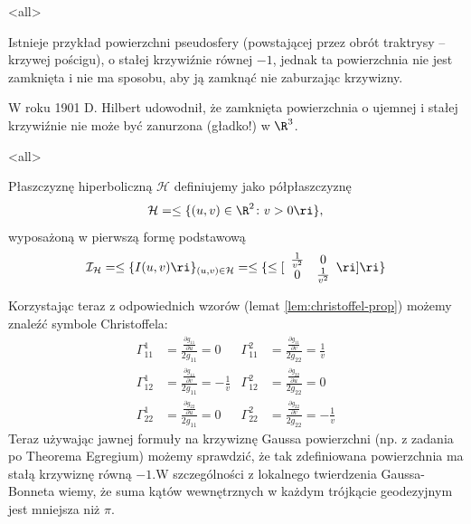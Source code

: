 \mode*
\mode<all>{}

\begin{frame}
Istnieje przykład powierzchni pseudosfery (powstającej przez obrót traktrysy -- krzywej pościgu), o stałej krzywiźnie równej $-1$, jednak ta powierzchnia nie jest zamknięta i nie ma sposobu, aby ją zamknąć nie zaburzając krzywizny.
\pause\begin{center}

\end{center}

\pause W roku 1901 D. Hilbert udowodnił, że zamknięta powierzchnia o ujemnej i stałej krzywiźnie nie może być zanurzona (gładko!) w $\R^3$. 

\end{frame}
\mode<all>{}

\begin{frame}

\begin{definicja}
Płaszczyznę hiperboliczną $\mathcal{H}$ definiujemy jako półpłaszczyznę 
\[\mathcal{H}=\le\{(u,v)\in \R^2\colon v>0 \ri\},\] wyposażoną w pierwszą formę podstawową
\[\mathcal{I}_{\mathcal{H}}=\le\{I(u,v)\ri\}_{(u,v)\in \mathcal{H}}=\le\{\le[
\begin{array}{cc}
\frac{1}{v^2}&0\\
0 & \frac{1}{v^2}
\end{array}
\ri]\ri\}
\]
\end{definicja}

\end{frame}

\begin{frame}[<+->]
Korzystając teraz z odpowiednich wzorów (lemat \ref{lem:christoffel-prop}) możemy znaleźć symbole Christoffela:
\begin{align*}
\Gamma^1_{11}&=\frac{\frac{\partial g_{11}}{\partial u}}{2g_{11}}=0 &
\Gamma^2_{11}&=\frac{\frac{\partial g_{11}}{\partial v}}{2g_{22}}=\frac{1}{v}\\
\Gamma^1_{12}&=\frac{\frac{\partial g_{11}}{\partial v}}{2g_{11}}=-\frac{1}{v} &
\Gamma^2_{12}&=\frac{\frac{\partial g_{22}}{\partial u}}{2g_{22}}=0\\
\Gamma^1_{22}&=\frac{\frac{\partial g_{22}}{\partial u}}{2g_{11}}=0 &
\Gamma^2_{22}&=\frac{\frac{\partial g_{22}}{\partial v}}{2g_{22}}=-\frac{1}{v}
\end{align*}
\pause Teraz używając jawnej formuły na krzywiznę Gaussa powierzchni (np. z zadania po Theorema Egregium) możemy sprawdzić, że tak zdefiniowana powierzchnia ma stałą krzywiznę równą $-1$.\pause W szczególności z lokalnego twierdzenia Gaussa-Bonneta wiemy, że suma kątów wewnętrznych w każdym trójkącie geodezyjnym jest mniejsza niż $\pi$.
\end{frame}

